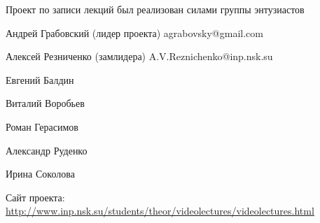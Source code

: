 \documentclass[12pt,pagesize,paper=192mm:108mm]{scrbook}
\begin{document}
\vspace*{0em}
%

  \begin{center}    
  \vfill

    \begin{minipage}{0.7\linewidth}
      Проект по записи лекций был реализован силами группы энтузиастов
\bigskip

Андрей Грабовский (лидер проекта) agrabovsky@gmail.com

Алексей Резниченко (замлидера) A.V.Reznichenko@inp.nsk.su

Евгений Балдин 

Виталий Воробьев 

Роман Герасимов

Александр Руденко

Ирина Соколова
\bigskip

\begin{flushleft}
  Сайт проекта:
  \url{http://www.inp.nsk.su/students/theor/videolectures/videolectures.html}
\end{flushleft}
    \end{minipage}
    \vfill

  \end{center}
\end{document}
